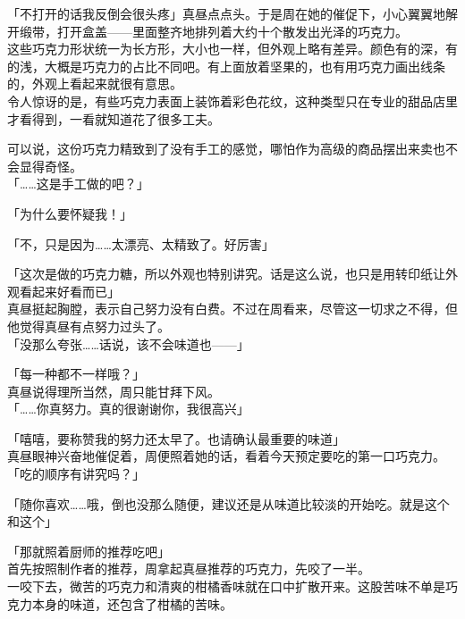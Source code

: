 「不打开的话我反倒会很头疼」真昼点点头。于是周在她的催促下，小心翼翼地解开缎带，打开盒盖——里面整齐地排列着大约十个散发出光泽的巧克力。\\

这些巧克力形状统一为长方形，大小也一样，但外观上略有差异。颜色有的深，有的浅，大概是巧克力的占比不同吧。有上面放着坚果的，也有用巧克力画出线条的，外观上看起来就很有意思。\\

令人惊讶的是，有些巧克力表面上装饰着彩色花纹，这种类型只在专业的甜品店里才看得到，一看就知道花了很多工夫。

可以说，这份巧克力精致到了没有手工的感觉，哪怕作为高级的商品摆出来卖也不会显得奇怪。\\

「……这是手工做的吧？」

「为什么要怀疑我！」

「不，只是因为……太漂亮、太精致了。好厉害」

「这次是做的巧克力糖，所以外观也特别讲究。话是这么说，也只是用转印纸让外观看起来好看而已」\\

真昼挺起胸膛，表示自己努力没有白费。不过在周看来，尽管这一切求之不得，但他觉得真昼有点努力过头了。\\

「没那么夸张……话说，该不会味道也——」

「每一种都不一样哦？」\\

真昼说得理所当然，周只能甘拜下风。\\

「……你真努力。真的很谢谢你，我很高兴」

「嘻嘻，要称赞我的努力还太早了。也请确认最重要的味道」\\

真昼眼神兴奋地催促着，周便照着她的话，看着今天预定要吃的第一口巧克力。\\

「吃的顺序有讲究吗？」

「随你喜欢……哦，倒也没那么随便，建议还是从味道比较淡的开始吃。就是这个和这个」

「那就照着厨师的推荐吃吧」\\

首先按照制作者的推荐，周拿起真昼推荐的巧克力，先咬了一半。\\

一咬下去，微苦的巧克力和清爽的柑橘香味就在口中扩散开来。这股苦味不单是巧克力本身的味道，还包含了柑橘的苦味。

